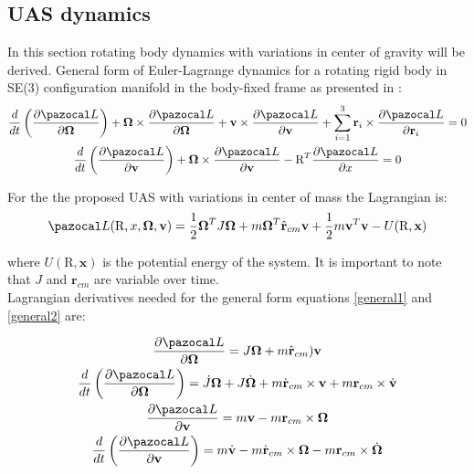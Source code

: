 \subsection{UAS dynamics}

In this section rotating body dynamics with variations in center of gravity will be derived.
General form of Euler-Lagrange dynamics for a rotating rigid body in SE(3) configuration manifold in the body-fixed frame as presented in \cite{LeeModel}:
\begin{gather}
	\frac{d}{dt} \left( \frac{\partial \La}{\partial \mb{\Omega}} \right)
	+ \mb{\Omega} \times \frac{\partial \La}{\partial \mb{\Omega}} 
	+ \textbf{v} \times \frac{\partial \La}{\partial \textbf{v}} 
	+ \sum_{i=1}^{3} \textbf{r}_i \times \frac{\partial \La}{\partial \textbf{r}_i} = 0 \label{general1}\\
	\frac{d}{dt} \left( \frac{\partial \La}{\partial \textbf{v}} \right)
	+ \mb{\Omega} \times \frac{\partial \La}{\partial \textbf{v}} 
	- \text{R}^T \frac{\partial \La}{\partial x} = 0 \label{general2}
\end{gather}

For the the proposed UAS with variations in center of mass the Lagrangian is:
\begin{equation}
	\La(\text{R},x,\mb{\Omega},\textbf{v}) = \frac{1}{2}\mb{\Omega}^TJ\mb{\Omega} + m \mb{\Omega}^T \hat{\textbf{r}}_{cm}\textbf{v} + \frac{1}{2}m\textbf{v}^T\textbf{v} - U(\text{R},\textbf{x})
\end{equation}

\noindent where $U(\text{R}, \textbf{x})$ is the potential energy of the system. It is important to note that $J$ and $\textbf{r}_{cm}$ are variable over time. \\
Lagrangian derivatives needed for the general form equations \ref{general1} and \ref{general2} are:

\begin{gather}
	\frac{\partial \La}{\partial \mb{\Omega}} = J\mb{\Omega} + m \hat{\textbf{r}}_{cm})\textbf{v} \label{d1}\\ 
	\frac{d}{dt} \left( \frac{\partial \La}{\partial \mb{\Omega}} \right) = \dot{J} \mb{\Omega} + J \dot{\mb{\Omega}} + m \dot{\textbf{r}}_{cm} \times \textbf{v} + m \textbf{r}_{cm} \times \dot{\textbf{v}} \label{d2}\\ 
	\frac{\partial \La}{\partial \textbf{v}} = m\textbf{v} - m\textbf{r}_{cm} \times \mb{\Omega} \label{d3}\\ 
	\frac{d}{dt} \left( \frac{\partial \La}{\partial \textbf{v}} \right) = m\dot{\textbf{v}} - m\dot{\textbf{r}}_{cm} \times \mb{\Omega} - m \textbf{r}_{cm} \times \dot{\mb{\Omega}} \label{d4}
\end{gather}

